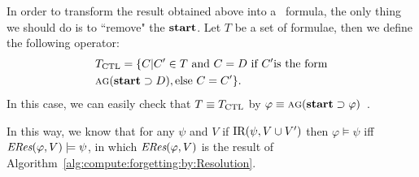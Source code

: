 \documentclass[letterpaper]{article}
\begin{document}
 

In order to transform the result obtained above into a \CTL\ formula, the only thing we should do is to ``remove" the $\textbf{start}$. Let $T$ be a set of formulae, then we define the following operator:
\begin{align*}
&T_{\textrm{CTL}} = \{C|C'\in T\ \mbox{and}\ C = D \ \mbox{if}\ C' \mbox{is the form}\\
& \textsc{a}\textsc{g}(\textbf{start}\supset D), \mbox{else}\ C= C'\}.
\end{align*}
In this case, we can easily check that $T \equiv T_{\textrm{CTL}}$ by $\varphi \equiv \textsc{a} \textsc{g} (\textbf{start} \supset \varphi)$~\cite{bolotov2000clausal}.

In this way, we know that for any $\psi$ and $V$ if $\textrm{IR}(\psi, V \cup V')$ then $\varphi \models \psi$ iff $\emph{ERes}(\varphi,V) \models \psi$, in which $\emph{ERes}(\varphi,V)$ is the result of Algorithm~\ref{alg:compute:forgetting:by:Resolution}. 

\end{document}

